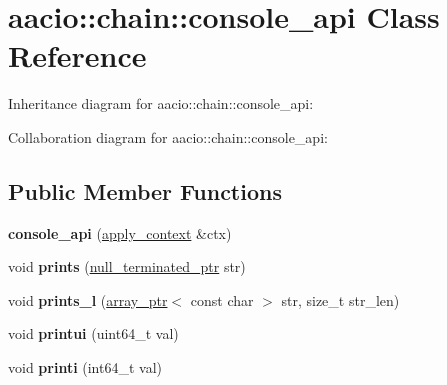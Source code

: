 \hypertarget{classaacio_1_1chain_1_1console__api}{}\section{aacio\+:\+:chain\+:\+:console\+\_\+api Class Reference}
\label{classaacio_1_1chain_1_1console__api}


Inheritance diagram for aacio\+:\+:chain\+:\+:console\+\_\+api\+:


Collaboration diagram for aacio\+:\+:chain\+:\+:console\+\_\+api\+:
\subsection*{Public Member Functions}
\begin{DoxyCompactItemize}
\item 
\mbox{\label{classaacio_1_1chain_1_1console__api_a0cef279cefa68e640c69ab0bd976667c}} 
{\bfseries console\+\_\+api} (\mbox{\hyperlink{classaacio_1_1chain_1_1apply__context}{apply\+\_\+context}} \&ctx)
\item 
\mbox{\label{classaacio_1_1chain_1_1console__api_a0dab01cb956e6f0f2e5a0f47d0a40e7f}} 
void {\bfseries prints} (\mbox{\hyperlink{structaacio_1_1chain_1_1null__terminated__ptr}{null\+\_\+terminated\+\_\+ptr}} str)
\item 
\mbox{\label{classaacio_1_1chain_1_1console__api_ae3511ce1de1c05637f89d532fbbeba85}} 
void {\bfseries prints\+\_\+l} (\mbox{\hyperlink{structaacio_1_1chain_1_1array__ptr}{array\+\_\+ptr}}$<$ const char $>$ str, size\+\_\+t str\+\_\+len)
\item 
\mbox{\label{classaacio_1_1chain_1_1console__api_acf4a907541d0ac67f9ef70bf6643c452}} 
void {\bfseries printui} (uint64\+\_\+t val)
\item 
\mbox{\label{classaacio_1_1chain_1_1console__api_ace4315e373fa8e1990b2a3f11e6ffd27}} 
void {\bfseries printi} (int64\+\_\+t val)
\item 
\mbox{\label{classaacio_1_1chain_1_1console__api_a876ad78a5daf501a0653987f0f58de17}} 

\end{DoxyCompactItemize}
